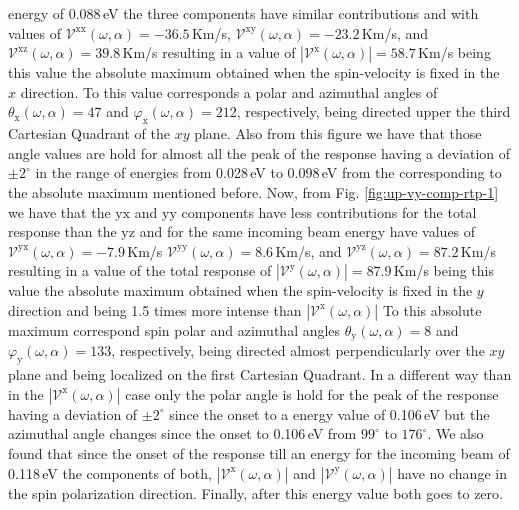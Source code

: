 \documentclass[prb,11pt,tightenlines,twocolumn,aps]{revtex4-1}
\begin{document}
energy of 0.088\,eV the three components have similar contributions and with
values of 
% 
$\mathcal{V}^{\mathrm{xx}}(\omega,\alpha)=-36.5$\,Km/s,
$\mathcal{V}^{\mathrm{xy}}(\omega,\alpha)=-23.2$\,Km/s, and
$\mathcal{V}^{\mathrm{xz}}(\omega,\alpha)= 39.8$\,Km/s 
% 
resulting in a value of
% 
$|\mathcal{V}^{\mathrm{x}}(\omega,\alpha)|=58.7$\,Km/s 
% 
being this value the absolute maximum obtained when the spin-velocity is fixed
in the $x$ direction. To this value corresponds a polar and azimuthal angles of
$\theta_{\mathrm{x}}(\omega,\alpha)=47$ and
$\varphi_{\mathrm{x}}(\omega,\alpha)=212$, respectively, being directed upper
the third Cartesian Quadrant of the $xy$ plane. Also from this figure we have
that those angle values are hold for almost all the peak of the response having
a deviation of $\pm 2^{\circ}$ in the range of energies from 0.028\,eV to
0.098\,eV from the corresponding to the absolute maximum mentioned before.
% 
Now, from Fig. \ref{fig:up-vy-comp-rtp-1} we have that the $\mathrm{yx}$ and
$\mathrm{yy}$ components have less contributions for the total response than the
$\mathrm{yz}$ and for the same incoming beam energy have values of
% 
$\mathcal{V}^{\mathrm{yx}}(\omega,\alpha)= -7.9$\,Km/s 
$\mathcal{V}^{\mathrm{yy}}(\omega,\alpha)=  8.6$\,Km/s, and
$\mathcal{V}^{\mathrm{yz}}(\omega,\alpha)= 87.2$\,Km/s 
% 
resulting in a value of the total response of
% 
$|\mathcal{V}^{\mathrm{y}}(\omega,\alpha)|=87.9$\,Km/s
% 
being this value the absolute maximum obtained when the spin-velocity is fixed
in the $y$ direction and being 1.5 times more intense than
$|\mathcal{V}^{\mathrm{x}}(\omega,\alpha)|$ To this absolute maximum correspond
spin polar and azimuthal angles $\theta_{\mathrm{y}}(\omega,\alpha)=8$ and
$\varphi_{\mathrm{y}}(\omega,\alpha)=133$, respectively, being directed almost
perpendicularly over the $xy$ plane and being localized on the first Cartesian
Quadrant. In a different way than in the
$|\mathcal{V}^{\mathrm{x}}(\omega,\alpha)|$ case only the polar angle is hold
for the peak of the response having a deviation of $\pm 2^{\circ}$ since the
onset to a energy value of 0.106\,eV but the azimuthal angle changes since the
onset to 0.106\,eV from $99^{\circ}$ to $176^{\circ}$.
% 
We also found that since the onset of the response till an energy for the
incoming beam of 0.118\,eV the components of both,
$|\mathcal{V}^{\mathrm{x}}(\omega,\alpha)|$ and
$|\mathcal{V}^{\mathrm{y}}(\omega,\alpha)|$ have no change in the spin
polarization direction. Finally, after this energy value both goes to zero.
\end{document}
